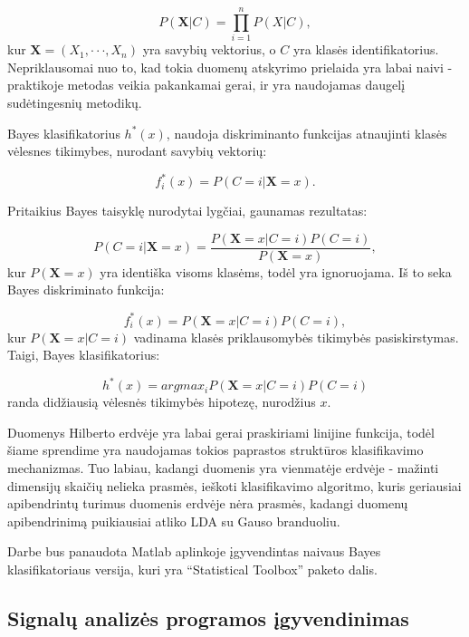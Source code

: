 \documentclass[]{vgtuef}
\begin{document}
\begin{equation}
	P(\mathbf{X}|C) = \prod_{i=1}^{n} P(X|C),
\end{equation}
kur $\mathbf{X} = (X_1, \cdot \cdot \cdot, X_n)$ yra savybių vektorius, o $C$ yra klasės identifikatorius. Nepriklausomai nuo to, kad tokia duomenų atskyrimo prielaida yra labai naivi - praktikoje metodas veikia pakankamai gerai, ir yra naudojamas daugelį sudėtingesnių metodikų.

Bayes klasifikatorius $h^*(x)$, naudoja diskriminanto funkcijas atnaujinti klasės vėlesnes tikimybes, nurodant savybių vektorių:

\begin{equation}
	f^*_i(x) = P(C=i|\mathbf{X}=x).
\end{equation}

Pritaikius Bayes taisyklę nurodytai lygčiai, gaunamas rezultatas:

\begin{equation}
P(C=i|\mathbf{X}=x) = \frac{P(\mathbf{X}=x|C=i)P(C=i)}{P(\mathbf{X}=x)},
\end{equation}
kur $P(\mathbf{X}=x)$ yra identiška visoms klasėms, todėl yra ignoruojama. Iš to seka Bayes diskriminato funkcija:

\begin{equation}
	f^*_i(x) = P(\mathbf{X}=x|C=i)P(C=i),
\end{equation}
kur $P(\mathbf{X}=x|C=i)$ vadinama klasės priklausomybės tikimybės pasiskirstymas. Taigi, Bayes klasifikatorius:

\begin{equation}
h^*(x) = arg max_i P(\mathbf{X}=x|C=i)P(C=i)
\end{equation}
randa didžiausią vėlesnės tikimybės hipotezę, nurodžius $x$.

Duomenys Hilberto erdvėje yra labai gerai praskiriami linijine funkcija, todėl šiame sprendime yra naudojamas tokios paprastos struktūros klasifikavimo mechanizmas. Tuo labiau, kadangi duomenis yra vienmatėje erdvėje - mažinti dimensijų skaičių nelieka prasmės, ieškoti klasifikavimo algoritmo, kuris geriausiai apibendrintų turimus duomenis erdvėje nėra prasmės, kadangi duomenų apibendrinimą puikiausiai atliko LDA su Gauso branduoliu.

Darbe bus panaudota Matlab aplinkoje įgyvendintas naivaus Bayes klasifikatoriaus versija, kuri yra ``Statistical Toolbox'' paketo dalis.

\subsection{Signalų analizės programos įgyvendinimas}
\label{subsec:total_program}
\end{document}
